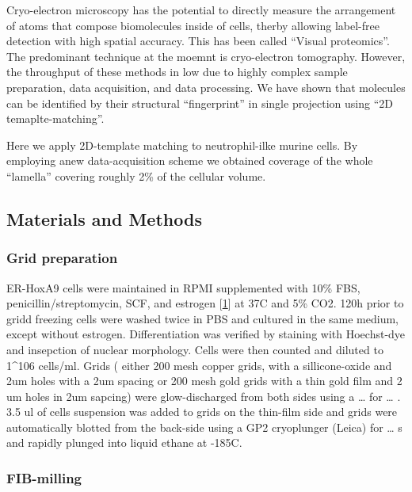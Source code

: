 \documentclass[
]{article}
\begin{document}
Cryo-electron microscopy has the potential to directly measure the arrangement of atoms that compose biomolecules inside of cells, therby allowing label-free detection with high spatial accuracy. This has been called ``Visual proteomics''. The predominant technique at the moemnt is cryo-electron tomography. However, the throughput of these methods in low due to highly complex sample preparation, data acquisition, and data processing. We have shown that molecules can be identified by their structural ``fingerprint'' in single projection using ``2D temaplte-matching''.

Here we apply 2D-template matching to neutrophil-ilke murine cells. By employing anew data-acquisition scheme we obtained coverage of the whole ``lamella'' covering roughly 2\% of the cellular volume.

\hypertarget{materials-and-methods}{%
\subsection{Materials and Methods}\label{materials-and-methods}}

\hypertarget{grid-preparation}{%
\subsubsection{Grid preparation}\label{grid-preparation}}

ER-HoxA9 cells were maintained in RPMI supplemented with 10\% FBS, penicillin/streptomycin, SCF, and estrogen {[}\protect\hyperlink{ref-1B9Vt9eYu}{1}{]} at 37C and 5\% CO2. 120h prior to gridd freezing cells were washed twice in PBS and cultured in the same medium, except without estrogen. Differentiation was verified by staining with Hoechst-dye and insepction of nuclear morphology. Cells were then counted and diluted to 1\^{}106 cells/ml. Grids ( either 200 mesh copper grids, with a sillicone-oxide and 2um holes with a 2um spacing or 200 mesh gold grids with a thin gold film and 2 um holes in 2um sapcing) were glow-discharged from both sides using a \ldots{} for \ldots{} . 3.5 ul of cells suspension was added to grids on the thin-film side and grids were automatically blotted from the back-side using a GP2 cryoplunger (Leica) for \ldots{} s and rapidly plunged into liquid ethane at -185C.

\hypertarget{fib-milling}{%
\subsubsection{FIB-milling}\label{fib-milling}}
\end{document}
